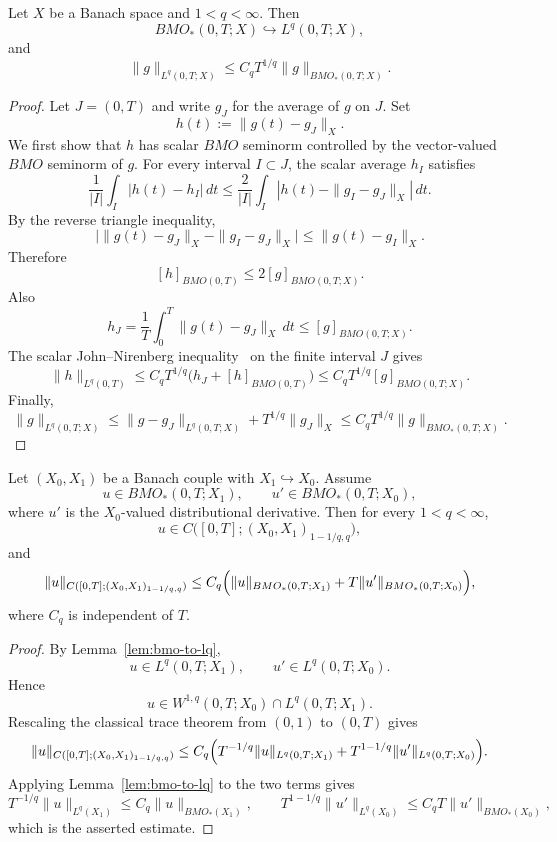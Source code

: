 \documentclass[smallextended,envcountsect,envcountsame]{svjour3}
\begin{document}
	\begin{lemma}\label{lem:bmo-to-lq}
	Let \(X\) be a Banach space and \(1<q<\infty\).  Then
	\[
	BMO_*(0,T;X)\hookrightarrow L^q(0,T;X),
	\]
	and
	\[
	\|g\|_{L^q(0,T;X)}
	\le
	C_q T^{1/q}\|g\|_{BMO_*(0,T;X)}.
	\]
	\end{lemma}

	\begin{proof}
	Let \(J=(0,T)\) and write \(g_J\) for the average of \(g\) on \(J\).  Set
	\[
	h(t):=\|g(t)-g_J\|_X.
	\]
	We first show that \(h\) has scalar \(BMO\) seminorm controlled by the vector-valued \(BMO\) seminorm of \(g\).  For every interval \(I\subset J\), the scalar average \(h_I\) satisfies
	\[
	\frac1{|I|}\int_I |h(t)-h_I|\,dt
	\le
	\frac2{|I|}\int_I |h(t)-\|g_I-g_J\|_X|\,dt.
	\]
	By the reverse triangle inequality,
	\[
	\bigl|\|g(t)-g_J\|_X-\|g_I-g_J\|_X\bigr|
	\le
	\|g(t)-g_I\|_X.
	\]
	Therefore
	\[
	[h]_{BMO(0,T)}\le 2[g]_{BMO(0,T;X)}.
	\]
	Also
	\[
	h_J=\frac1T\int_0^T\|g(t)-g_J\|_X\,dt
	\le [g]_{BMO(0,T;X)}.
	\]
	The scalar John--Nirenberg inequality~\cite{JohnNirenberg1961} on the finite interval \(J\) gives
	\[
	\|h\|_{L^q(0,T)}
	\le
	C_q T^{1/q}\bigl(h_J+[h]_{BMO(0,T)}\bigr)
	\le
	C_q T^{1/q}[g]_{BMO(0,T;X)}.
	\]
	Finally,
	\[
	\|g\|_{L^q(0,T;X)}
	\le
	\|g-g_J\|_{L^q(0,T;X)}+T^{1/q}\|g_J\|_X
	\le
	C_qT^{1/q}\|g\|_{BMO_*(0,T;X)}.
	\]
	\end{proof}

	\begin{theorem}\label{thm:bmo-lions-peetre-trace}
	Let \((X_0,X_1)\) be a Banach couple with \(X_1\hookrightarrow X_0\).  Assume
	\[
	u\in BMO_*(0,T;X_1),
	\qquad
	u'\in BMO_*(0,T;X_0),
	\]
	where \(u'\) is the \(X_0\)-valued distributional derivative.  Then for every \(1<q<\infty\),
	\[
	u\in C\bigl([0,T];(X_0,X_1)_{1-1/q,q}\bigr),
	\]
	and
	\[
	\|u\|_{C([0,T];(X_0,X_1)_{1-1/q,q})}
	\le
	C_q\Bigl(
	\|u\|_{BMO_*(0,T;X_1)}+
	T\|u'\|_{BMO_*(0,T;X_0)}
	\Bigr),
	\]
	where $C_q$ is independent of $T$.
	\end{theorem}

	\begin{proof}
	By Lemma~\ref{lem:bmo-to-lq},
	\[
	u\in L^q(0,T;X_1),
	\qquad
	u'\in L^q(0,T;X_0).
	\]
	Hence
	\[
	u\in W^{1,q}(0,T;X_0)\cap L^q(0,T;X_1).
	\]
	Rescaling the classical trace theorem from $(0,1)$ to $(0,T)$ gives
	\[
	\|u\|_{C([0,T];(X_0,X_1)_{1-1/q,q})}
	\le C_q\Bigl(
	T^{-1/q}\|u\|_{L^q(0,T;X_1)}
	+T^{1-1/q}\|u'\|_{L^q(0,T;X_0)}
	\Bigr).
	\]
	Applying Lemma~\ref{lem:bmo-to-lq} to the two terms gives
	\[
	T^{-1/q}\|u\|_{L^q(X_1)}\le C_q\|u\|_{BMO_*(X_1)},
	\qquad
	T^{1-1/q}\|u'\|_{L^q(X_0)}\le C_qT\|u'\|_{BMO_*(X_0)},
	\]
	which is the asserted estimate.
	\end{proof}
\end{document}
